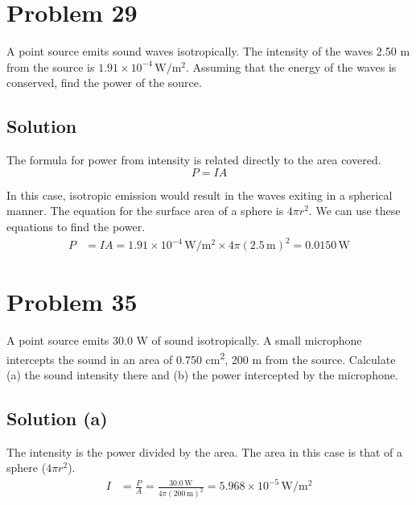 \documentclass[12pt]{article}
\newcommand{\E}[1]{\times 10^{#1}}
\begin{document}
    \pagebreak
    \section{Problem 29}
        A point source emits sound waves isotropically. 
        The intensity of the waves 2.50 m from the source is $1.91\E{-4}\,\unit{\watt/\meter^2}$. 
        Assuming that the energy of the waves is conserved, find the power of the source.

        \subsection{Solution}
            The formula for power from intensity is related directly to the area covered.
            \begin{equation}
                P   =   IA
            \end{equation}

            In this case, isotropic emission would result in the waves exiting in a spherical manner.
            The equation for the surface area of a sphere is $4\pi r^2$.
            We can use these equations to find the power.
            \begin{align}
                P   &=  IA
                    =   1.91\E{-4}\,\unit{\watt/\meter^2} \times 4\pi (2.5\,\unit{\meter})^2
                    =   \boxed{0.0150\,\unit{\watt}}
            \end{align}

    \pagebreak
    \section{Problem 35}
        A point source emits 30.0 W of sound isotropically. 
        A small microphone intercepts the sound in an area of 0.750 \unit{\centi\meter^2}, 200 m from the source. 
        Calculate (a) the sound intensity there and (b) the power intercepted by the microphone.

        \subsection{Solution (a)}
            The intensity is the power divided by the area.
            The area in this case is that of a sphere ($4\pi r^2$).
            \begin{align}
                I   &=  \frac{P}{A}
                    =   \frac{30.0\,\unit{\watt}}{4\pi (200\,\unit{\meter})^2}
                    =   \boxed{5.968\E{-5}\,\unit{\watt/\meter^2}}
            \end{align}
\end{document}

